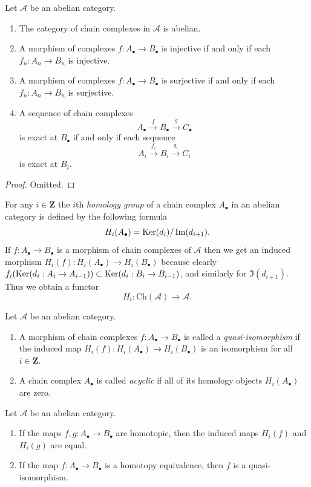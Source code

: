 \begin{lemma}
\label{lemma-cat-chain-abelian}
Let $\mathcal{A}$ be an abelian category.
\begin{enumerate}
\item The category of chain complexes in $\mathcal{A}$ is
abelian.
\item A morphism of complexes
$f : A_\bullet \to B_\bullet$ is injective
if and only if each $f_n : A_n \to B_n$ is injective.
\item A morphism of complexes
$f : A_\bullet \to B_\bullet$ is surjective
if and only if each $f_n : A_n \to B_n$ is surjective.
\item A sequence of chain complexes
$$
A_\bullet \xrightarrow{f} B_\bullet \xrightarrow{g} C_\bullet
$$
is exact at $B_\bullet$ if and only if each sequence
$$
A_i \xrightarrow{f_i} B_i \xrightarrow{g_i} C_i
$$
is exact at $B_i$.
\end{enumerate}
\end{lemma}

\begin{proof}
Omitted.
\end{proof}

\noindent
For any $i \in \mathbf{Z}$ the $i$th {\it homology group}
of a chain complex $A_\bullet$ in an abelian category is defined by
the following formula
$$
H_i(A_\bullet) = \mathop{\mathrm{Ker}}(d_i)/\mathop{\mathrm{Im}}(d_{i + 1}).
$$
If $f : A_\bullet \to B_\bullet$ is a morphism of chain
complexes of $\mathcal{A}$ then we get an induced
morphism $H_i(f) : H_i(A_\bullet) \to H_i(B_\bullet)$
because clearly
$f_i(\mathop{\mathrm{Ker}}(d_i : A_i \to A_{i - 1})) \subset
\mathop{\mathrm{Ker}}(d_i : B_i \to B_{i - 1})$, and similarly
for $\Im(d_{i + 1})$.
Thus we obtain a functor
$$
H_i : \text{Ch}(\mathcal{A}) \longrightarrow \mathcal{A}.
$$

\begin{definition}
\label{definition-quasi-isomorphism}
Let $\mathcal{A}$ be an abelian category.
\begin{enumerate}
\item A morphism of chain complexes $f : A_\bullet \to B_\bullet$
is called a {\it quasi-isomorphism} if the induced
map $H_i(f) : H_i(A_\bullet) \to H_i(B_\bullet)$
is an isomorphism for all $i \in \mathbf{Z}$.
\item A chain complex $A_\bullet$ is called
{\it acyclic} if all of its homology objects
$H_i(A_\bullet)$ are zero.
\end{enumerate}
\end{definition}


\begin{lemma}
\label{lemma-map-homology-homotopy}
Let $\mathcal{A}$ be an abelian category.
\begin{enumerate}
\item If the maps $f, g : A_\bullet \to B_\bullet$ are
homotopic, then the induced maps $H_i(f)$ and $H_i(g)$
are equal.
\item If the map $f : A_\bullet \to B_\bullet$ is a homotopy
equivalence, then $f$ is a quasi-isomorphism.
\end{enumerate}
\end{lemma}

